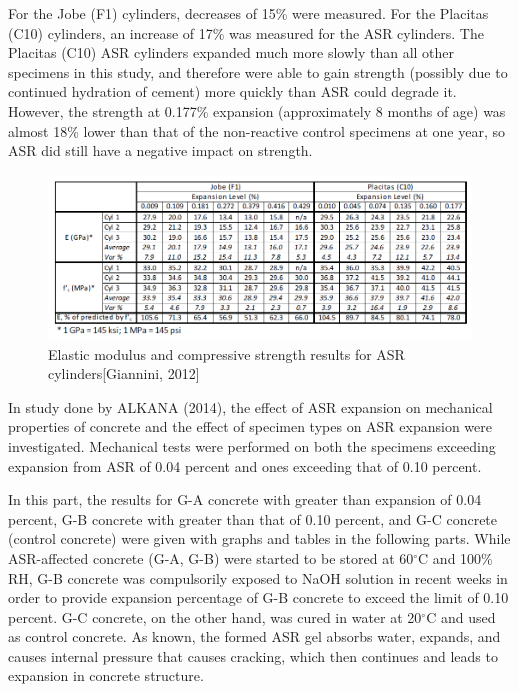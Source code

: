 For the Jobe (F1) cylinders, decreases of 15\% were measured. For the Placitas (C10) cylinders, an increase of 17\% was measured for the ASR cylinders. The Placitas (C10) ASR cylinders expanded much more slowly than all other specimens in this study, and therefore were able to gain strength (possibly due to continued hydration of cement) more quickly than ASR could degrade it. However, the strength at 0.177\% expansion (approximately 8 months of age) was almost 18\% lower than that of the non-reactive control specimens at one year, so ASR did still have a negative impact on strength.

\begin{figure}[h!]
  \centering
  \includegraphics[width=0.8\linewidth]{Reference/GIANNINIASR.png}
  \caption{Elastic modulus and compressive strength results for ASR cylinders[Giannini, 2012\cite{GIANNINI}]}
  \label{Giannini, 2012}
\end{figure}

\clearpage

In study done by ALKANA (2014)\cite{ALKANA}, the effect of ASR expansion on mechanical properties of concrete and the effect of specimen types on ASR expansion were investigated. Mechanical tests were performed on both the specimens exceeding expansion from ASR of 0.04 percent and ones exceeding that of 0.10 percent.

In this part, the results for G-A concrete with greater than expansion of 0.04 percent, G-B concrete with greater than that of 0.10 percent, and G-C concrete (control concrete) were given with graphs and tables in the following parts. While ASR-affected concrete (G-A, G-B) were started to be stored at 60$^\circ$C and 100\% RH, G-B concrete was compulsorily exposed to NaOH solution in recent weeks in order to provide expansion percentage of G-B concrete to exceed the limit of 0.10 percent. G-C concrete, on the other hand, was cured in water at 20$^\circ$C and used as control concrete. As known, the formed ASR gel absorbs water, expands, and causes internal pressure that causes cracking, which then continues and leads to expansion in concrete structure.



